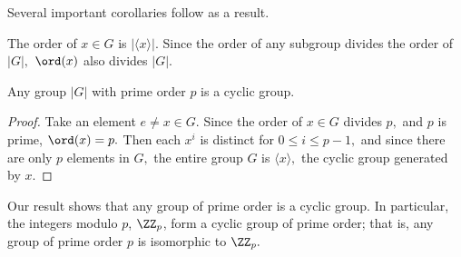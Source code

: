 Several important corollaries follow as a result.
\begin{corollary}
The order of $x \in G$ is $|\langle x \rangle|.$ Since the order of any subgroup divides the order of $|G|,$ $\ord(x)$ also divides $|G|$.
\end{corollary}

\begin{corollary}
Any group $|G|$ with prime order $p$ is a cyclic group. 
\end{corollary}
\begin{proof}
Take an element $e \neq x \in G.$ Since the order of $x \in G$ divides $p,$ and $p$ is prime, $\ord(x) = p.$ Then each $x^i$ is distinct for $0 \leq i \leq p-1,$ and since there are only $p$ elements in $G,$ the entire group $G$ is $\langle x \rangle,$ the cyclic group generated by $x.$
\end{proof}

Our result shows that any group of prime order is a cyclic group. In particular, the integers modulo $p$, $\ZZ_p$, form a cyclic group of prime order; that is, any group of prime order $p$ is isomorphic to $\ZZ_p.$ 

